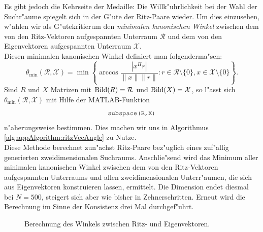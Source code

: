 Es gibt jedoch die Kehrseite der Medaille: Die Willk"uhrlichkeit bei der Wahl der Suchr"aume spiegelt sich in der G"ute der Ritz-Paare wieder. Um dies einzusehen, w"ahlen wir als G"utekritierum den \emph{minimalen kanonischen Winkel} zwischen dem von den Ritz-Vektoren aufgespannten Unterraum $\mathcal{R}$ und dem von den Eigenvektoren aufgespannten Unterraum $\mathcal{X}$.\\

Diesen minimalen kanonischen Winkel definiert man folgenderma"sen:
\[
\theta_{\min}(\mathcal{R},\mathcal{X}) =
\min
\left\{\arccos\frac{|x^H r|}{\|x\|\|r\|} : r\in\mathcal{R}\setminus\{0\}, x\in\mathcal{X}\setminus\{0\}\right\}.
\]
Sind $R$ und $X$ Matrizen mit $\operatorname{Bild}(R)=\mathcal{R}$ und $\operatorname{Bild}(X)=\mathcal{X}$, so l"asst sich $\theta_{\min}(\mathcal{R},\mathcal{X})$ mit Hilfe der MATLAB-Funktion
\[
\mcode{subspace(R,X)}
\]
n"aherungsweise bestimmen. Dies machen wir uns in Algorithmus \ref{alg:appAlgorithm:ritzVecAngle} zu Nutze.\\

Diese Methode berechnet zun"achst Ritz-Paare bez"uglich eines zuf"allig generierten zweidimensionalen Suchraums. Anschlie"send wird das Minimum aller minimalen kanonischen Winkel zwischen dem von den Ritz-Vektoren aufgespannten Unterraums und allen zweidimensionalen Unterr"aumen, die sich aus Eigenvektoren konstruieren lassen, ermittelt. Die Dimension endet diesmal bei $N=500$, steigert sich aber wie bisher in Zehnerschritten. Erneut wird die Berechnung im Sinne der Konsistenz drei Mal durchgef"uhrt.

\newpage

\begin{figure}[h!]
\centering


\caption{Berechnung des Winkels zwischen Ritz- und Eigenvektoren.}\label{fig:chap5:winkel}
\end{figure}

